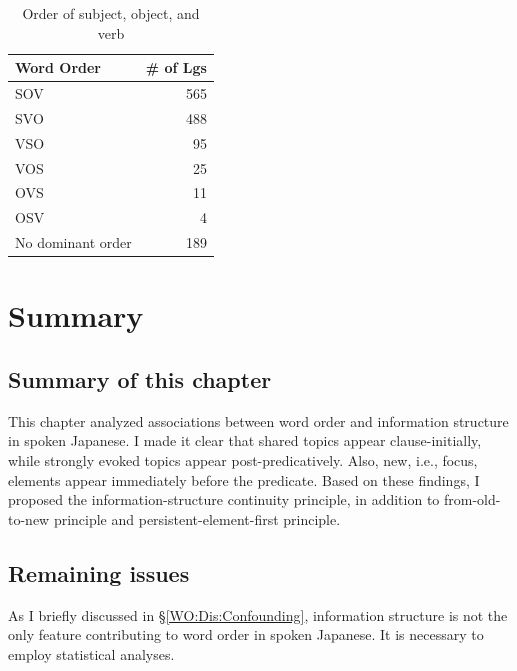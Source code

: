 \begin{table}
\centering
\caption{Order of subject, object, and verb \cite{wals-81}}
\label{wals-81}
\begin{tabular}{lr}
	\toprule
	Word Order & \# of Lgs \\
	\midrule
	SOV &	565 \\
	SVO &	488 \\
	VSO &	95 \\
	VOS &	25 \\
	OVS &	11 \\
	OSV &	4 \\
	No dominant order &	189 \\
	\bottomrule
\end{tabular}
\end{table}










\section{Summary}

\subsection{Summary of this chapter}

This chapter analyzed associations between word order and information structure in spoken Japanese.
I made it clear that
shared topics appear clause-initially,
while strongly evoked topics appear post-predicatively.
Also, new, i.e., focus, elements appear immediately before the predicate.
Based on these findings,
I proposed the information-structure continuity principle,
in addition to from-old-to-new principle and persistent-element-first principle.


\subsection{Remaining issues}

As I briefly discussed in \S \ref{WO:Dis:Confounding},
information structure is not the only feature contributing to word order in spoken Japanese.
It is necessary to employ statistical analyses.












